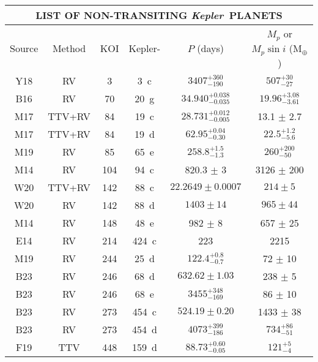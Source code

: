 \documentclass{aastex62}
\newcommand{\ik}{{\it Kepler~}}
\begin{document}
\begin{table}[!hbt]
    \centering
    \begin{tabular}{|c|c||c|c||c|c|}
        \multicolumn{6}{c}{\textbf{LIST OF NON-TRANSITING \ik PLANETS}}\\
        \hline
        Source & Method & KOI & Kepler- &  $P$ (days) &$M_p$ or $M_p \sin{i}$ (M$_\oplus$)  \\
        \hline
Y18 & RV  & 3 & 3~c & $3407^{+360}_{-190}$ & $507^{+30}_{-27}$ \\
B16  & RV  & 70 & 20~g &  $34.940^{+0.038}_{-0.035}$ &  $19.96^{+3.08}_{-3.61}$ \\ 
M17 & TTV+RV & 84 & 19~c & $28.731^{+0.012}_{-0.005}$ & 13.1 $\pm$ 2.7 \\
M17 & TTV+RV & 84 & 19~d & $62.95^{+0.04}_{-0.30}$ & $22.5^{+1.2}_{-5.6}$\\
M19 & RV & 85 & 65~e & $258.8^{+1.5}_{-1.3}$ & $260^{+200}_{-50}$\\
M14  & RV  & 104 & 94~c  &  820.3 $\pm$ 3  &  3126 $\pm$ 200   \\ 
W20 & TTV+RV & 142 & 88~c & $22.2649 \pm 0.0007$ & $214 \pm 5$\\
W20 & RV & 142 & 88~d & $1403 \pm 14$ & $965 \pm 44$\\
M14  & RV  & 148 & 48~e &  982 $\pm$ 8 &  657 $\pm$ 25   \\ 
E14 & RV & 214 & 424~c & 223 & 2215 \\
M19  & RV  & 244 & 25~d &  $122.4^{+0.8}_{-0.7}$ &  72 $\pm$ 10   \\ 
B23  & RV  & 246 & 68~d &  $632.62 \pm 1.03$ &  238 $\pm$ 5  \\ 
B23  & RV  & 246 & 68~e &  $3455^{+348}_{-169}$ &  86 $\pm$ 10  \\ 
B23  & RV  & 273 & 454~c &  $524.19 \pm 0.20$ &  1433 $\pm$ 38  \\ 
B23  & RV  & 273 & 454~d &  $4073^{+399}_{-186}$ &  $734 ^{+86}_{-51}$  \\ 
F19 & TTV & 448 & 159~d & $88.73^{+0.60}_{-0.05}$ & $121^{+5}_{-4}$\\

\end{tabular}
\end{table}
\end{document}
